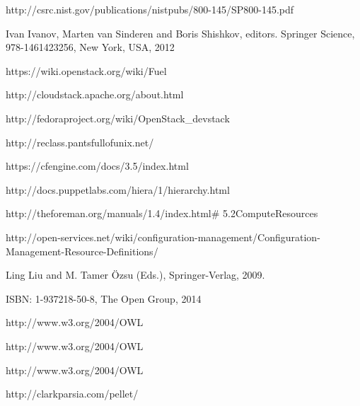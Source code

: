 


\newblock http://csrc.nist.gov/publications/nistpubs/800-145/SP800-145.pdf

Ivan Ivanov, Marten van Sinderen and Boris Shishkov, editors.
\newblock Springer Science, 978-1461423256, New York, USA, 2012

\newblock https://wiki.openstack.org/wiki/Fuel

\newblock http://cloudstack.apache.org/about.html

\newblock http://fedoraproject.org/wiki/OpenStack\_devstack

\newblock http://reclass.pantsfullofunix.net/

\newblock https://cfengine.com/docs/3.5/index.html

\newblock http://docs.puppetlabs.com/hiera/1/hierarchy.html

\newblock http://theforeman.org/manuals/1.4/index.html\# 5.2ComputeResources

\newblock http://open-services.net/wiki/configuration-management/Configuration-Management-Resource-Definitions/


\newblock Ling Liu and M. Tamer Özsu (Eds.), Springer-Verlag, 2009.

\newblock ISBN:  1-937218-50-8, The Open Group, 2014

\newblock http://www.w3.org/2004/OWL

\newblock http://www.w3.org/2004/OWL


\newblock http://www.w3.org/2004/OWL

\newblock http://clarkparsia.com/pellet/



